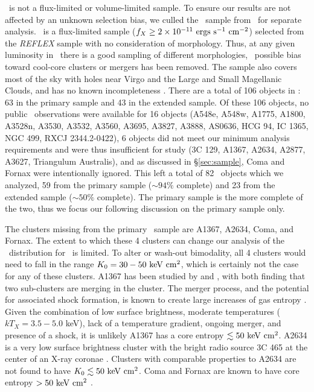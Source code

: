 \documentclass[12pt,preprint]{aastex}
\begin{document}
\accept\ is not a flux-limited or volume-limited sample. To ensure our
results are not affected by an unknown selection bias, we culled the
\hifl\ sample from \accept\ for separate analysis. \hifl\ is a
flux-limited sample ($f_X \ge 2 \times 10^{-11} \mathrm{\mbox{\ensuremath{\mathrm{~ergs}}} \mathrm{\mbox{\ensuremath{\mathrm{~s}}}^{-1}} \mbox{\ensuremath{\mathrm{~cm^{-2}}}}}$) selected from
the {\it{REFLEX}} sample \citep{reflex} with no consideration of
morphology. Thus, at any given luminosity in \hifl\ there is a good
sampling of different morphologies, \ie\ possible bias toward
cool-core clusters or mergers has been removed. The sample also covers
most of the sky with holes near Virgo and the Large and Small
Magellanic Clouds, and has no known incompleteness
\citep{2007A&A...466..805C}. There are a total of 106 objects in
\hifl: 63 in the primary sample and 43 in the extended sample. Of
these 106 objects, no public \chandra\ observations were available for
16 objects (A548e, A548w, A1775, A1800, A3528n, A3530, A3532, A3560,
A3695, A3827, A3888, AS0636, HCG 94, IC 1365, NGC 499, RXCJ
2344.2-0422), 6 objects did not meet our minimum analysis requirements
and were thus insufficient for study (3C 129, A1367, A2634, A2877,
A3627, Triangulum Australis), and as discussed in \S\ref{sec:sample},
Coma and Fornax were intentionally ignored. This left a total of 82
\hifl\ objects which we analyzed, 59 from the primary sample ($\sim
94\%$ complete) and 23 from the extended sample ($\sim 50\%$
complete). The primary sample is the more complete of the two, thus we
focus our following discussion on the primary sample only.

The clusters missing from the primary \hifl\ sample are A1367, A2634,
Coma, and Fornax. The extent to which these 4 clusters can change our
analysis of the \kna\ distribution for \hifl\ is limited.  To alter or
wash-out bimodality, all 4 clusters would need to fall in the range
$K_0 = 30-50 \mathrm{\mbox{\ensuremath{\mathrm{~keV}}} \mathrm{\mbox{\ensuremath{\mathrm{~cm}}}^2}}$, which is certainly not the case for any of these
clusters. A1367 has been studied by \citet{1998ApJ...500..138D} and
\citet{2002ApJ...576..708S}, with both finding that two sub-clusters
are merging in the cluster. The merger process, and the potential for
associated shock formation, is known to create large increases of gas
entropy \citep{2007MNRAS.376..497M}. Given the combination of low
surface brightness, moderate temperatures ($kT_X = 3.5-5.0$ keV), lack
of a temperature gradient, ongoing merger, and presence of a shock, it
is unlikely A1367 has a core entropy $\lesssim 50 \mathrm{\mbox{\ensuremath{\mathrm{~keV}}} \mathrm{\mbox{\ensuremath{\mathrm{~cm}}}^2}}$. A2634 is a very
low surface brightness cluster with the bright radio source 3C 465 at
the center of an X-ray coronae \citep{coronae}. Clusters with
comparable properties to A2634 are not found to have $K_0 \lesssim 50
\mathrm{\mbox{\ensuremath{\mathrm{~keV}}} \mathrm{\mbox{\ensuremath{\mathrm{~cm}}}^2}}$. Coma and Fornax are known to have core entropy $> 50 \mathrm{\mbox{\ensuremath{\mathrm{~keV}}} \mathrm{\mbox{\ensuremath{\mathrm{~cm}}}^2}}$
\citep[][C. Scharf, private communication]{2008arXiv0802.1864R}.
\end{document}
